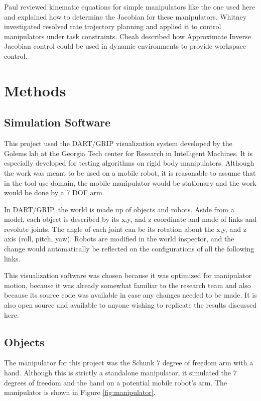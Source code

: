 \documentclass[10pt, conference]{IEEEtran}
\begin{document}
  Paul reviewed kinematic equations for simple manipulators like the
  one used here and explained how to determine the Jacobian for these
  manipulators.\cite{paul} Whitney investigated resolved rate trajectory planning
  and applied it to control manipulators under task constraints.\cite{whitney} Cheah
  described how Approximate Inverse Jacobian control could be used in
  dynamic environments to provide workspace control.\cite{cheah}
\section{Methods}
\label{sec-3}
\subsection{Simulation Software}
\label{sec-3-1}

   This project used the DART/GRIP visualization system developed by the
   Golems lab at the Georgia Tech center for Research in Intelligent
   Machines. It is especially developed for testing algorithms on rigid
   body manipulators. Although the work was meant to be used on a mobile
   robot, it is reasonable to assume that in the tool use domain, the
   mobile manipulator would be stationary and the work would be done by
   a 7 DOF arm.

   In DART/GRIP, the world is made up of objects and robots. Aside from
   a model, each object is described by its x,y, and z coordinate and
   made of links and revolute joints. The angle of each joint can be
   its rotation about the x,y, and z axis (roll, pitch, yaw). Robots are
   modified in the world inspector, and the change would automatically
   be reflected on the configurations of all the following links.

   This visualization software was chosen because it was optimized for
   manipulator motion, because it was already somewhat familiar to the
   research team and also because its source code was available in case
   any changes needed to be made. It is also open source and available
   to anyone wishing to replicate the results discussed here.
\subsection{Objects}
\label{sec-3-2}

   The manipulator for this project was the Schunk 7 degree of freedom
   arm with a hand. Although this is strictly a standalone manipulator,
   it simulated the 7 degrees of freedom and the hand on a potential
   mobile robot’s arm. The manipulator is shown in Figure \ref{fig:manipulator}.
\end{document}
